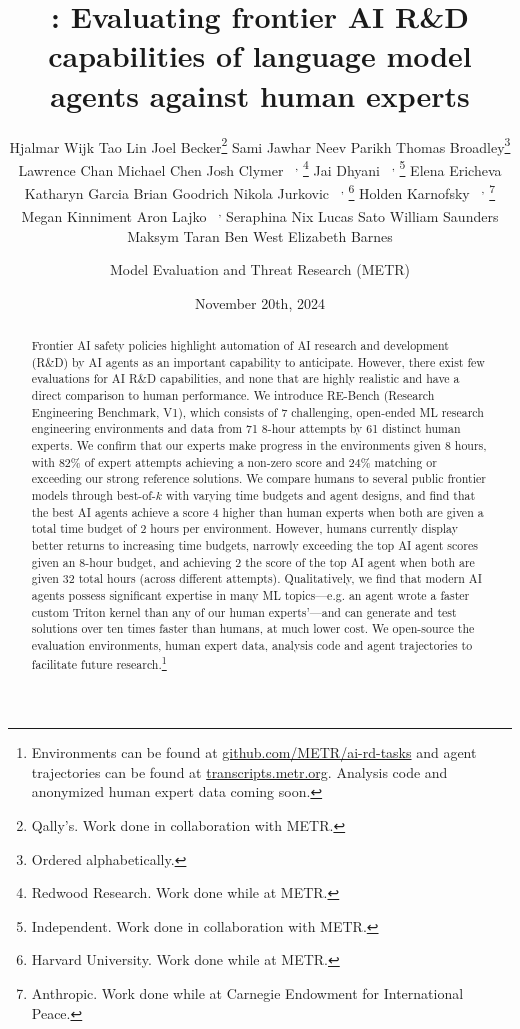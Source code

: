 \documentclass{article}
\title{\EvalName: Evaluating frontier AI R\&D capabilities of language model agents against human experts}
\author{
Hjalmar Wijk
\And
Tao Lin
\And
Joel Becker\thanks{Qally's. Work done in collaboration with METR.}
\And 
Sami Jawhar
\And
Neev Parikh
\And
Thomas Broadley\thanks{Ordered alphabetically.}
\And
Lawrence Chan\footnotemark[2]
\And 
Michael Chen\footnotemark[2]
\And 
Josh Clymer\footnotemark[2] \textsuperscript{~~, }\thanks{Redwood Research. Work done while at METR.}
\And
Jai Dhyani\footnotemark[2]\textsuperscript{~~, }\thanks{Independent. Work done in collaboration with METR.}
\And
Elena Ericheva\footnotemark[2]
\And
Katharyn Garcia\footnotemark[2]
\And 
Brian Goodrich\footnotemark[2]
\And 
Nikola Jurkovic\footnotemark[2]\textsuperscript{~~, }\thanks{Harvard University. Work done while at METR.}
\And
Holden Karnofsky\footnotemark[2]\textsuperscript{~~, }\thanks{Anthropic. Work done while at Carnegie Endowment for International Peace.}
\And
Megan Kinniment\footnotemark[2]
\And
Aron Lajko\footnotemark[2]\textsuperscript{~~, }\footnotemark[3]
\And
Seraphina Nix\footnotemark[2]
\And 
Lucas Sato\footnotemark[2]
\And
William Saunders\footnotemark[2]
\And
Maksym Taran\footnotemark[2]
\And
Ben West\footnotemark[2]
\And 
Elizabeth Barnes\\
\and Model Evaluation and Threat Research (METR)
}
\date{November 20th, 2024}
\newcommand{\EvalName}{RE-Bench}
\newcommand{\FullEvalName}{Research Engineering Benchmark, V1}
\newcommand{\NumBaselines}{71}
\newcommand{\NumBaseliners}{61}
\newcommand{\NonZeroPercent}{82} %
\newcommand{\ReferencePercent}{24} %
\newcommand{\AgentMultipleHumanScoreAtTwoHours}{4\texttimes{}} %
\newcommand{\HumanMultipleAgentScoreAtMaxHours}{2\texttimes{}} %
\begin{document}
\maketitle

\setcounter{footnote}{0}
\renewcommand{\thefootnote}{\arabic{footnote}}

\begin{abstract} 
Frontier AI safety policies highlight automation of AI research and development (R\&D) by AI agents as an important capability to anticipate. 
However, there exist few evaluations for AI R\&D capabilities, and none that are highly realistic and have a direct comparison to human performance. 
We introduce \EvalName{} (\FullEvalName), which consists of 7 challenging, open-ended ML research engineering environments and data from \NumBaselines{} 8-hour attempts by \NumBaseliners{} distinct human experts. 
We confirm that our experts make progress in the environments given 8 hours, with \NonZeroPercent\% of expert attempts achieving a non-zero score and \ReferencePercent\% matching or exceeding our strong reference solutions. 
We compare humans to several public frontier models through best-of-$k$ with varying time budgets and agent designs, and find that the best AI agents achieve a score \AgentMultipleHumanScoreAtTwoHours{} higher than human experts when both are given a total time budget of 2 hours per environment. 
However, humans currently display better returns to increasing time budgets, narrowly exceeding the top AI agent scores given an 8-hour budget, and achieving \HumanMultipleAgentScoreAtMaxHours{} the score of the top AI agent when both are given 32 total hours (across different attempts). 
Qualitatively, we find that modern AI agents possess significant expertise in many ML topics---e.g. an agent wrote a faster custom Triton kernel than any of our human experts'---and can generate and test solutions over ten times faster than humans, at much lower cost.
We open-source the evaluation environments, human expert data, analysis code and agent trajectories to facilitate future research.\footnote{Environments can be found at \href{https://github.com/METR/ai-rd-tasks/tree/main}{github.com/METR/ai-rd-tasks} and agent trajectories can be found at \href{https://transcripts.metr.org/}{transcripts.metr.org}. Analysis code and anonymized human expert data coming soon.}
\end{abstract}
\end{document}
